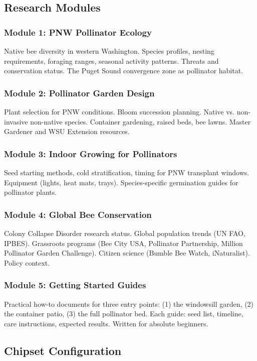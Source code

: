 \documentclass[11pt,letterpaper]{article}
\begin{document}
\subsection{Research Modules}

\subsubsection{Module 1: PNW Pollinator Ecology}
Native bee diversity in western Washington. Species profiles, nesting requirements, foraging ranges, seasonal activity patterns. Threats and conservation status. The Puget Sound convergence zone as pollinator habitat.

\subsubsection{Module 2: Pollinator Garden Design}
Plant selection for PNW conditions. Bloom succession planning. Native vs. non-invasive non-native species. Container gardening, raised beds, bee lawns. Master Gardener and WSU Extension resources.

\subsubsection{Module 3: Indoor Growing for Pollinators}
Seed starting methods, cold stratification, timing for PNW transplant windows. Equipment (lights, heat mats, trays). Species-specific germination guides for pollinator plants.

\subsubsection{Module 4: Global Bee Conservation}
Colony Collapse Disorder research status. Global population trends (UN FAO, IPBES). Grassroots programs (Bee City USA, Pollinator Partnership, Million Pollinator Garden Challenge). Citizen science (Bumble Bee Watch, iNaturalist). Policy context.

\subsubsection{Module 5: Getting Started Guides}
Practical how-to documents for three entry points: (1) the windowsill garden, (2) the container patio, (3) the full pollinator bed. Each guide: seed list, timeline, care instructions, expected results. Written for absolute beginners.

\subsection{Chipset Configuration}
\end{document}
